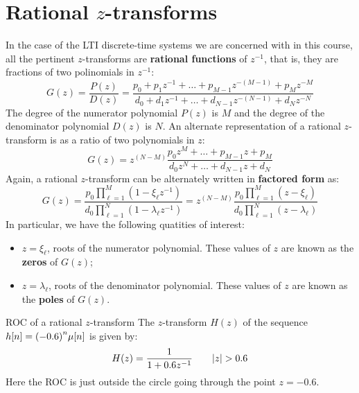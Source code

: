 \documentclass[../../main/main.tex]{subfiles}
\begin{document}
\section{Rational \( z \)-transforms}
In the case of the LTI discrete-time systems we are concerned with in this course, all the pertinent \( z \)-transforms are \textbf{rational functions} of \( z^{-1} \), that is, they are fractions of two polinomials in \( z^{-1} \):
\begin{equation}
    G(z)
    =
    \frac{P(z)}{D(z)}
    =
    \frac{p_{0} + p_{1}z^{-1} + \dots + p_{M-1}z^{-(M-1)} + p_{M}z^{-M}}{d_{0} + d_{1}z^{-1} + \dots + d_{N-1}z^{-(N-1)} + d_{N}z^{-N}}
    \label{eq:L14_S17_1}
\end{equation}
The degree of the numerator polynomial \( P(z) \) is \( M \) and the degree of the denominator polynomial \( D(z) \) is \( N \). An alternate representation of a rational \( z \)-transform is as a ratio of two polynomials in \( z \):
\begin{equation}
    G(z)
    =
    z^{(N-M)} \frac{p_{0}z^{M} + \dots + p_{M-1}z + p_{M}}{d_{0}z^{N} + \dots + d_{N-1}z + d_{N}}
    \label{eq:L14_S18_1}
\end{equation}
Again, a rational \( z \)-transform can be alternately written in \textbf{factored form} as:
\begin{equation}
    G(z)
    =
    \frac{\displaystyle p_{0} \prod_{\ell=1}^{M} (1 - \xi_{\ell}z^{-1})}{\displaystyle d_{0} \prod_{\ell=1}^{N} (1 - \lambda_{\ell}z^{-1})}
    =
    z^{(N-M)} \frac{\displaystyle p_{0} \prod_{\ell=1}^{M} (z - \xi_{\ell})}{\displaystyle d_{0} \prod_{\ell=1}^{N} (z - \lambda_{\ell})}
    \label{eq:L14_S19_1}
\end{equation}
In particular, we have the following quatities of interest:
\begin{itemize}
    \item \( z = \xi_{\ell} \), roots of the numerator polynomial. These values of \( z \) are known as the \textbf{zeros} of \( G(z) \);
    \item \( z = \lambda_{\ell} \), {roots} of the denominator polynomial. These values of \( z \) are known as the \textbf{poles} of \( G(z) \).
\end{itemize}

\begin{example}{\boldmath ROC of a rational \( z \)-transform}{}
    The \( z \)-transform \( H(z) \) of the sequence \( h[n] = \qty(-0.6)^{n} \mu[n] \) is given by:
    \begin{equation}
        H(z)
        =
        \frac{1}{1 + 0.6z^{-1}}
        \qquad
        \abs{z} > 0.6
        \label{eq:L14_S23_1}
    \end{equation}
    Here the ROC is just outside the circle going through the point \( z = - 0.6 \).
\end{example}
\end{document}
